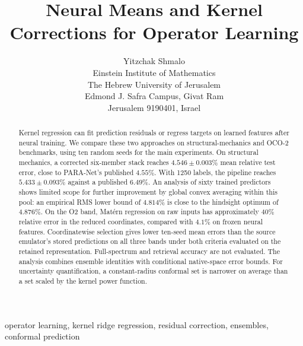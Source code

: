 \documentclass[twoside,11pt]{article}
\newcommand{\errSix}{4.546}          %
\newcommand{\errSixSd}{0.003}
\newcommand{\saSixtyOracleRms}{4.876}
\newcommand{\saBound}{4.814}         %
\newcommand{\errBestLow}{5.433}      %
\newcommand{\errBestLowSd}{0.093}    %
\newcommand{\pubBestHi}{4.55}        %
\newcommand{\pubBestLo}{6.49}        %
\begin{document}
\raggedbottom

\title{Neural Means and Kernel Corrections for Operator Learning}

\author{\name Yitzchak Shmalo \email  \\
       \addr Einstein Institute of Mathematics\\
       The Hebrew University of Jerusalem\\
       Edmond J. Safra Campus, Givat Ram\\
       Jerusalem 9190401, Israel}

\maketitle

\begin{abstract}%
Kernel regression can fit prediction residuals or regress targets on learned
features after neural training. We compare these two approaches on
structural-mechanics and OCO-2 benchmarks, using ten random seeds for the
main experiments. On structural mechanics, a corrected six-member stack reaches
$\errSix\pm\errSixSd\%$ mean relative test error, close to PARA-Net's published
$\pubBestHi\%$. With
1250 labels, the pipeline reaches $\errBestLow\pm\errBestLowSd\%$ against a
published $\pubBestLo\%$. An analysis of sixty trained predictors shows limited
scope for further improvement by global convex averaging within this pool:
an empirical RMS lower bound of
$\saBound\%$ is close to the hindsight optimum of $\saSixtyOracleRms\%$.
On the O2 band, Mat\'ern regression on raw inputs has approximately $40\%$
relative error in the reduced coordinates, compared with $4.1\%$ on frozen
neural features. Coordinatewise selection gives lower ten-seed mean errors than
the source emulator's stored predictions on all three bands under both
criteria evaluated on the retained representation. Full-spectrum and
retrieval accuracy are not evaluated. The analysis combines
ensemble identities with conditional native-space error bounds.
For uncertainty quantification, a constant-radius conformal set is narrower on
average than a set scaled by the kernel power function.
\end{abstract}

\begin{keywords}
operator learning, kernel ridge regression, residual correction, ensembles,
conformal prediction
\end{keywords}
\end{document}
